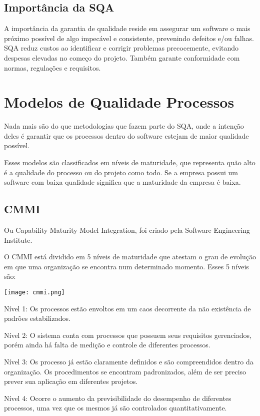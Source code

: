 \documentclass{article}
\begin{document}
\subsection*{Importância da SQA}
A importância da garantia de qualidade
reside em assegurar um software o mais próximo possível
de algo impecável e consistente, prevenindo defeitos 
e/ou falhas. SQA reduz custos ao identificar
e corrigir problemas precocemente, evitando
despesas elevadas no começo do projeto. Também
garante conformidade com normas, regulações e requisitos.

\section{Modelos de Qualidade Processos}
Nada mais são do que metodologias que fazem parte do SQA,
onde a intenção deles é garantir que os processos dentro
do software estejam de maior qualidade possível.

Esses modelos são classificados em níveis de maturidade,
que representa quão alto é a qualidade do processo ou do projeto
como todo. Se a empresa possui um software com baixa qualidade
significa que a maturidade da empresa é baixa.

\subsection*{CMMI}
Ou Capability Maturity Model Integration, foi criado
pela Software Engineering Institute. 

O CMMI está dividido em 5 níveis de maturidade
que atestam o grau de evolução em que uma organização
se encontra num determinado momento.
Esses 5 níveis são:

\begin{center}
    \texttt{[image: cmmi.png]}
\end{center}

\newpage
Nível 1: Os processos estão envoltos
em um caos decorrente da não existência de padrões
estabilizados.

Nível 2: O sistema conta com processos
que possuem seus requisitos gerenciados,
porém ainda há falta de medição e controle de diferentes
processos.

Nível 3: Os processo já estão claramente definidos
e são compreendidos dentro da organização. Os procedimentos
se encontram padronizados, além de ser preciso prever sua aplicação
em diferentes projetos.

Nível 4: Ocorre o aumento da previsibilidade
do desempenho de diferentes processos, uma vez que os
mesmos já são controlados quantitativamente.
\end{document}
